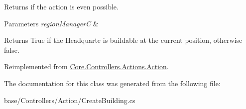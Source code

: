 Returns if the action is even possible. 


\begin{DoxyParams}{Parameters}
{\em region\-Manager\-C} & \\
\hline
\end{DoxyParams}
\begin{DoxyReturn}{Returns}
True if the Headquarte is buildable at the current position, otherwise false.
\end{DoxyReturn}


Reimplemented from \hyperlink{classCore_1_1Controllers_1_1Actions_1_1Action_a405b995343a9394ad19e05a699a4e6d9}{Core.\-Controllers.\-Actions.\-Action}.



The documentation for this class was generated from the following file\-:\begin{DoxyCompactItemize}
\item 
base/\-Controllers/\-Action/Create\-Building.\-cs\end{DoxyCompactItemize}
